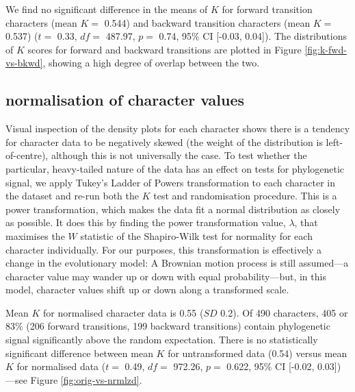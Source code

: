We find no significant difference in the means of \(K\) for forward transition characters (mean \(K =\) 0.544) and backward transition characters (mean \(K =\) 0.537) (\(t=\) 0.33, \(df=\) 487.97, \(p=\) 0.74, 95\% CI {[}-0.03, 0.04{]}). The distributions of \(K\) scores for forward and backward transitions are plotted in Figure \ref{fig:k-fwd-vs-bkwd}, showing a high degree of overlap between the two.

\hypertarget{norm-characters}{%
\subsection{normalisation of character values}\label{norm-characters}}

Visual inspection of the density plots for each character shows there is a tendency for character data to be negatively skewed (the weight of the distribution is left-of-centre), although this is not universally the case. To test whether the particular, heavy-tailed nature of the data has an effect on tests for phylogenetic signal, we apply Tukey's Ladder of Powers transformation to each character in the dataset and re-run both the \(K\) test and randomisation procedure. This is a power transformation, which makes the data fit a normal distribution as closely as possible. It does this by finding the power transformation value, \(\lambda\), that maximises the \(W\) statistic of the Shapiro-Wilk test for normality for each character individually. For our purposes, this transformation is effectively a change in the evolutionary model: A Brownian motion process is still assumed---a character value may wander up or down with equal probability---but, in this model, character values shift up or down along a transformed scale.

Mean \(K\) for normalised character data is 0.55 (\(SD\) 0.2). Of 490 characters, 405 or 83\% (206 forward transitions, 199 backward transitions) contain phylogenetic signal significantly above the random expectation. There is no statistically significant difference between mean \(K\) for untransformed data (0.54) versus mean \(K\) for normalised data (\(t=\) 0.49, \(df=\) 972.26, \(p=\) 0.622, 95\% CI {[}-0.02, 0.03{]})---see Figure \ref{fig:orig-vs-nrmlzd}.

